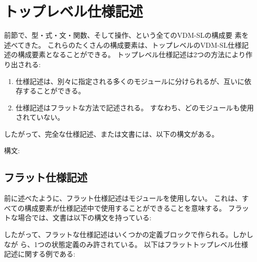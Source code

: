 \documentclass[\pformat,12pt]{jarticle}
\begin{document}
\newpage
\section{トップレベル仕様記述}
\label{top-level}\label{modules}

前節で、型・式・文・関数、そして操作、という全てのVDM-SLの構成要
素を述べてきた。
これらのたくさんの構成要素は、トップレベルのVDM-SL仕様記述の構成要素となることができる。
トップレベル仕様記述は2つの方法により作り出される:
\begin{enumerate}
\item 仕様記述は、別々に指定される多くのモジュールに分けられるが、互いに依存することができる。
\item 仕様記述はフラットな方法で記述される。 すなわち、どのモジュールも使用されていない。
\end{enumerate}
したがって、完全な仕様記述、または文書には、以下の構文がある。

\begin{description}
\item[構文:]

\end{description}

\subsection{フラット仕様記述}\label{flat}

前に述べたように、フラット仕様記述はモジュールを使用しない。
これは、すべての構成要素が仕様記述中で使用することができることを意味する。 
フラットな場合では、文書は以下の構文を持っている:



したがって、フラットな仕様記述はいくつかの定義ブロックで作られる。しかしなが
ら、1つの状態定義のみ許されている。
以下はフラットトップレベル仕様記述に関する例である:
\end{document}
